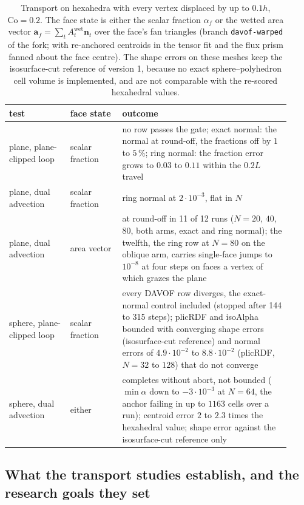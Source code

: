 \documentclass[preprint,12pt]{elsarticle}
\begin{document}
\begin{table}[htbp]
\centering
\caption{Transport on hexahedra with every vertex displaced by up to $0.1h$, $\mathrm{Co} = 0.2$. The face state is either the scalar fraction $\alpha_f$ or the wetted area vector $\mathbf{a}_f = \sum_t A^{\mathrm{wet}}_t \mathbf{n}_t$ over the face's fan triangles (branch \texttt{davof-warped} of the fork; with re-anchored centroids in the tensor fit and the flux prism fanned about the face centre). The shape errors on these meshes keep the isosurface-cut reference of version 1, because no exact sphere--polyhedron cell volume is implemented, and are not comparable with the re-scored hexahedral values.}
\label{tab:tpf-perturbed}
\footnotesize
\begin{tabular}{p{0.2\linewidth}p{0.17\linewidth}p{0.55\linewidth}}
\toprule
test & face state & outcome \\
\midrule
plane, plane-clipped loop & scalar fraction & no row passes the gate; exact normal: the normal at round-off, the fractions off by $1$ to $5\,\%$; ring normal: the fraction error grows to $0.03$ to $0.11$ within the $0.2L$ travel \\
plane, dual advection & scalar fraction & ring normal at $2\cdot10^{-3}$, flat in $N$ \\
plane, dual advection & area vector & at round-off in 11 of 12 runs ($N = 20$, $40$, $80$, both arms, exact and ring normal); the twelfth, the ring row at $N = 80$ on the oblique arm, carries single-face jumps to $10^{-8}$ at four steps on faces a vertex of which grazes the plane \\
\midrule
sphere, plane-clipped loop & scalar fraction & every DAVOF row diverges, the exact-normal control included (stopped after 144 to 315 steps); plicRDF and isoAlpha bounded with converging shape errors (isosurface-cut reference) and normal errors of $4.9\cdot10^{-2}$ to $8.8\cdot10^{-2}$ (plicRDF, $N = 32$ to $128$) that do not converge \\
sphere, dual advection & either & completes without abort, not bounded ($\min\alpha$ down to $-3\cdot10^{-3}$ at $N = 64$, the anchor failing in up to $1163$ cells over a run); centroid error $2$ to $2.3$ times the hexahedral value; shape error against the isosurface-cut reference only \\
\bottomrule
\end{tabular}
\end{table}

\subsection{What the transport studies establish, and the research goals they set}
\label{sec:tpf-summary}
\end{document}
